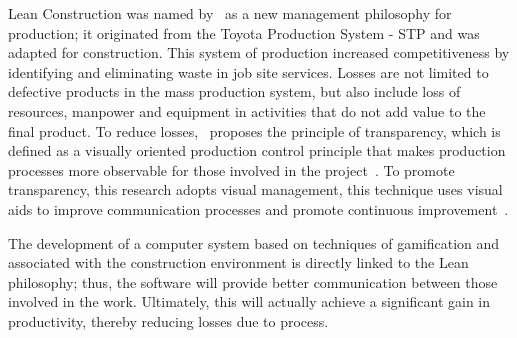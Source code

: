 Lean Construction was named by~\cite{Koskela} as a new management philosophy for production; it originated from the Toyota Production System - STP and was adapted for construction. This system of production increased competitiveness by identifying and eliminating waste in job site services. Losses are not limited to defective products in the mass production system, but also include loss of resources, manpower and equipment in activities that do not add value to the final product. To reduce losses,~\cite{Koskela} proposes the principle of transparency, which is defined as a visually oriented production control principle that makes production processes more observable for those involved in the project~\cite{Womack}. To promote transparency, this research adopts visual management, this technique uses visual aids to improve communication processes and promote continuous improvement~\cite{Cicmil}.

The development of a computer system based on techniques of gamification and associated with the construction environment is directly linked to the Lean philosophy; thus, the software will provide better communication between those involved in the work. Ultimately, this will actually achieve a significant gain in productivity, thereby reducing losses due to process.

